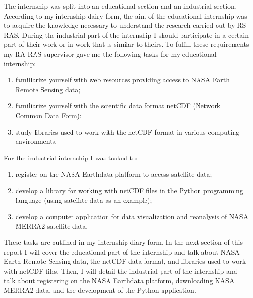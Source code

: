 \documentclass[../00_main.tex]{subfiles}
\begin{document}
The internship was split into an educational section and an industrial section. 
According to my internship dairy form, the aim of the educational internship
was
to acquire the knowledge necessary to understand the research carried out by RS
RAS. During the industrial part of the internship I should participate in
a certain part of their work or in work that is similar to theirs. To fulfill 
these requirements my RA RAS supervisor gave me the following tasks for my 
educational internship:
\begin{enumerate}
    \item familiarize yourself with web resources providing access to NASA 
        Earth Remote Sensing data;
    \item familiarize yourself with the scientific data format netCDF (Network
        Common Data Form);
    \item study libraries used to work with the netCDF format in various 
        computing environments.
\end{enumerate}
For the industrial internship I was tasked to:
\begin{enumerate}
    \item register on the NASA Earthdata platform to access satellite data;
    \item develop a library for working with netCDF files in the Python
        programming language (using satellite data as an example);
    \item develop a computer application for data visualization and reanalysis 
        of NASA MERRA2 satellite data.
\end{enumerate}
These tasks are outlined in my internship diary form. In the next section of
this report I will cover the educational part of the internship and talk about NASA
Earth Remote Sensing data, the netCDF data format, and libraries used to work
with netCDF files. Then, I will detail the industrial part of the internship
and talk about registering on the NASA Earthdata platform, downloading NASA
MERRA2 data, and the development of the Python application.
\end{document}
